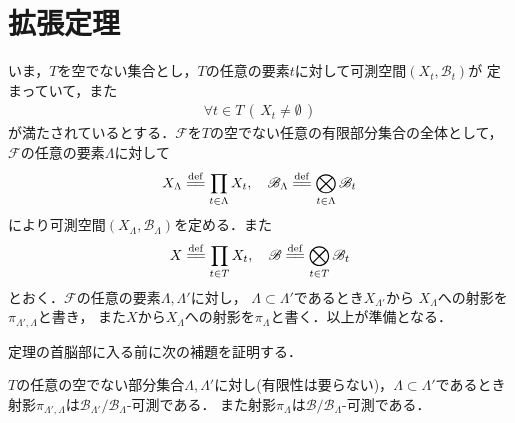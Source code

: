\section{拡張定理}
	いま，$T$を空でない集合とし，$T$の任意の要素$t$に対して可測空間$(X_t,\mathscr{B}_t)$が
	定まっていて，また
	\begin{align}
		\forall t \in T\, (\, X_t \neq \emptyset\, )
	\end{align}
	が満たされているとする．$\mathscr{F}$を$T$の空でない任意の有限部分集合の全体として，$\mathscr{F}$の任意の要素$\Lambda$に対して
	\begin{align}
		X_\Lambda \defeq \prod_{t \in \Lambda} X_t,
		\quad \mathscr{B}_\Lambda \defeq \bigotimes_{t \in \Lambda} \mathscr{B}_t
	\end{align}
	により可測空間$(X_\Lambda,\mathscr{B}_\Lambda)$を定める．また
	\begin{align}
		X \defeq \prod_{t \in T} X_t,
		\quad \mathscr{B} \defeq \bigotimes_{t \in T} \mathscr{B}_t
	\end{align}
	とおく．$\mathscr{F}$の任意の要素$\Lambda,\Lambda'$に対し，
	$\Lambda \subset \Lambda'$であるとき$X_{\Lambda'}$から
	$X_{\Lambda}$への射影を$\pi_{\Lambda',\Lambda}$と書き，
	また$X$から$X_\Lambda$への射影を$\pi_{\Lambda}$と書く．以上が準備となる．
	
	定理の首脳部に入る前に次の補題を証明する．
	\begin{screen}
		\begin{lem}[射影の可測性]\label{lem:Kolmogorov_extension_theorem}
			$T$の任意の空でない部分集合$\Lambda,\Lambda'$に対し(有限性は要らない)，$\Lambda \subset \Lambda'$であるとき
			射影$\pi_{\Lambda',\Lambda}$は$\mathscr{B}_{\Lambda'}/\mathscr{B}_\Lambda$-可測である．
			また射影$\pi_\Lambda$は$\mathscr{B}/\mathscr{B}_\Lambda$-可測である．
		\end{lem}
	\end{screen}
	
